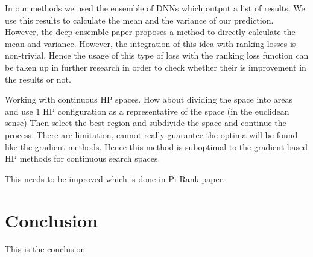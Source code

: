 \documentclass[12pt, twoside, ngerman]{report}
\begin{document}
In our methods we used the ensemble of DNNs which output a list of results.
We use this results to calculate the mean and the variance of our  prediction.
However,  the deep ensemble paper proposes a method to directly calculate the mean
and variance.
However,  the integration of this idea with ranking losses is non-trivial.
Hence the usage of this type of loss with the ranking loss function can be taken up in further research in order to check whether their is improvement in the results or not.

Working with continuous HP spaces.
How about dividing the space into areas and use 1 HP configuration as a representative
of the space (in the euclidean sense)
Then select the best region and subdivide the space and continue the process.
There are limitation,  cannot really guarantee the optima will be found like the gradient methods.
Hence this method is suboptimal to the gradient based HP methods for continuous search spaces.


This needs to be improved which is done in Pi-Rank paper.

 
\section{Conclusion}
This is the conclusion






\appendix
\end{document}
